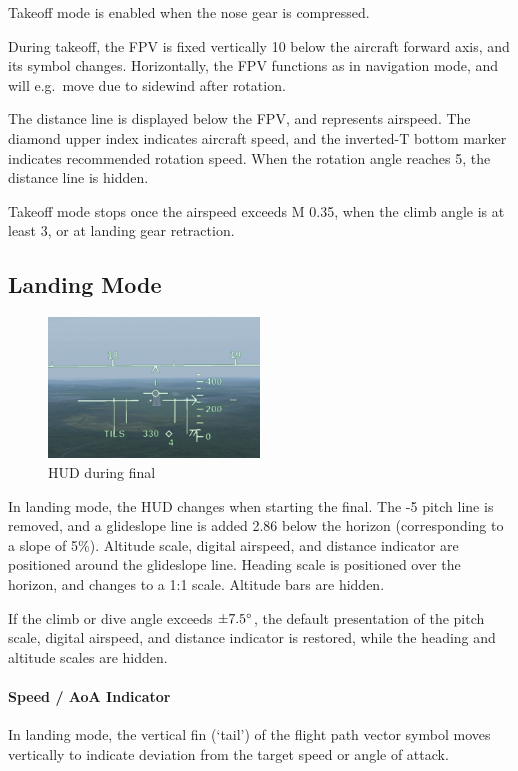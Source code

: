 Takeoff mode is enabled when the nose gear is compressed.

During takeoff, the FPV is fixed vertically 10\textdegree{}
below the aircraft forward axis, and its symbol changes.
Horizontally, the FPV functions as in navigation mode,
and will e.g.\ move due to sidewind after rotation.

The distance line is displayed below the FPV, and represents airspeed.
The diamond upper index indicates aircraft speed,
and the inverted-T bottom marker indicates recommended rotation speed.
When the rotation angle reaches 5\textdegree{}, the distance line is hidden.

Takeoff mode stops once the airspeed exceeds M 0.35,
when the climb angle is at least 3\textdegree{},
or at landing gear retraction.

\subsection{Landing Mode}
\begin{figure}[!ht]
  \centering
  \includegraphics[width=0.5\textwidth]{images/displays/ja-hud-landing.png}
  \caption{HUD during final}
  \label{fig:hud-landing}
\end{figure}

In landing mode, the HUD changes when starting the final.
The -5\textdegree{} pitch line is removed,
and a glideslope line is added 2.86\textdegree{} below the horizon
(corresponding to a slope of 5\%).
Altitude scale, digital airspeed, and distance indicator are positioned around the glideslope line.
Heading scale is positioned over the horizon, and changes to a 1:1 scale.
Altitude bars are hidden.

If the climb or dive angle exceeds $\pm 7.5\degree$,
the default presentation of the pitch scale, digital airspeed, and distance indicator is restored,
while the heading and altitude scales are hidden.

\paragraph{Speed / AoA Indicator}
In landing mode, the vertical fin (`tail') of the flight path vector symbol
moves vertically to indicate deviation from the target speed or angle of attack.

